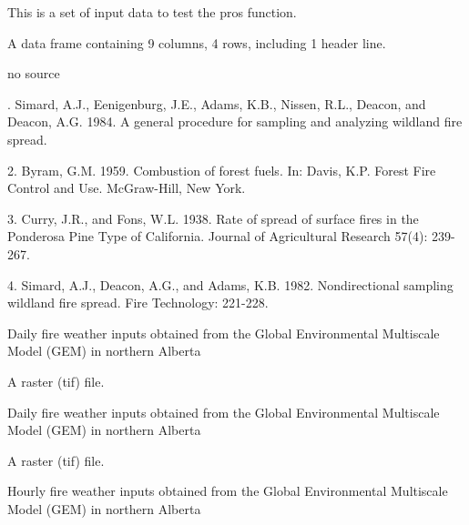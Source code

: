 \documentclass[a4paper]{book}
\begin{document}
%
\begin{Description}\relax
This is a set of input data to test the pros function.
\end{Description}
%
\begin{Format}
A data frame containing 9 columns, 4 rows, including 1 header line.
\end{Format}
%
\begin{Source}\relax
no source
\end{Source}
%
\begin{References}. Simard, A.J., Eenigenburg, J.E., Adams, K.B., Nissen, R.L.,
Deacon, and Deacon, A.G. 1984. A general procedure for sampling and
analyzing wildland fire spread.

2. Byram, G.M. 1959. Combustion of forest fuels. In: Davis, K.P. Forest Fire
Control and Use. McGraw-Hill, New York.

3. Curry, J.R., and Fons, W.L. 1938. Rate of spread of surface fires in the
Ponderosa Pine Type of California. Journal of Agricultural Research 57(4):
239-267.

4. Simard, A.J., Deacon, A.G., and Adams, K.B. 1982. Nondirectional sampling
wildland fire spread. Fire Technology: 221-228.
\end{References}
%
\begin{Description}\relax
Daily fire weather inputs obtained from the Global Environmental Multiscale
Model (GEM) in northern Alberta
\end{Description}
%
\begin{Format}
A raster (tif) file.
\end{Format}
%
\begin{Description}\relax
Daily fire weather inputs obtained from the Global Environmental Multiscale
Model (GEM) in northern Alberta
\end{Description}
%
\begin{Format}
A raster (tif) file.
\end{Format}
%
\begin{Description}\relax
Hourly fire weather inputs obtained from the Global Environmental Multiscale
Model (GEM) in northern Alberta
\end{Description}
\end{document}
